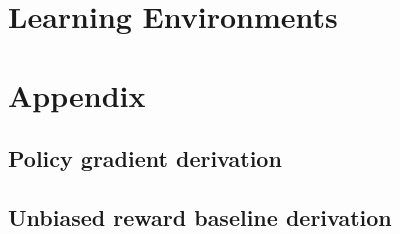 \documentclass{article}
\begin{document}
\section{Learning Environments}


\section{Appendix}
\subsection{Policy gradient derivation}


\subsection{Unbiased reward baseline derivation}




\end{document}
